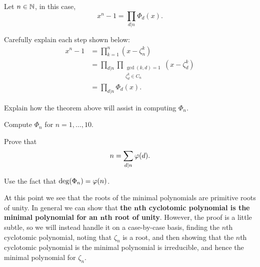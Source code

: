 \documentclass{ximera}
\begin{document}
\begin{theorem}
  Let $n\in \mathbb N$, in this case,
  \[
  x^n-1 = \prod_{d|n} \Phi_d(x).
  \]
  \begin{sketch}
    Carefully explain each step shown below:
    \begin{align*}
      x^n - 1 &= \prod_{k=1}^n (x-\zeta_n^k) \\
      &=\prod_{d|n}\prod_{\substack{\gcd(k,d) = 1\\ \zeta_d^k \in C_n}}(x-\zeta_d^k) \\
      &=\prod_{d|n} \Phi_d(x).
    \end{align*}
  \end{sketch}
\end{theorem}

\begin{exercise}
  Explain how the theorem above will assist in computing $\Phi_n$.
\end{exercise}


\begin{exercise}
  Compute $\Phi_n$ for $n = 1, \dots, 10$.
\end{exercise}

\begin{exercise}
  Prove that 
  \[
  n = \sum_{d|n} \eulerphi(d).
  \]
  \begin{hint}
    Use the fact that $\deg(\Phi_n) = \eulerphi(n)$.
  \end{hint}
\end{exercise}


At this point we see that the roots of the minimal polynomials are
primitive roots of unity. In general we can show that \textbf{the
  $\boldsymbol{n}$th cyclotomic polynomial is the minimal polynomial
  for an $\boldsymbol{n}$th root of unity}. However, the proof is a
little subtle, so we will instead handle it on a case-by-case basis,
finding the $n$th cyclotomic polynomial, noting that $\zeta_n$ is a
root, and then showing that the $n$th cyclotomic polynomial is the
minimal polynomial is irreducible, and hence the minimal polynomial
for $\zeta_n$.








  
\end{document}
